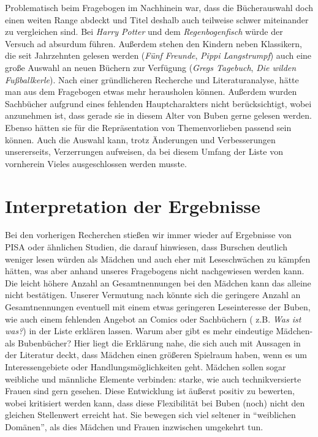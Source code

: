 

Problematisch beim Fragebogen im Nachhinein war, dass die Bücherauswahl
doch einen weiten Range abdeckt und Titel deshalb auch teilweise schwer
miteinander zu vergleichen sind. Bei \emph{Harry Potter} und dem
\emph{Regenbogenfisch} würde der Versuch ad absurdum führen. Außerdem
stehen den Kindern neben Klassikern, die seit Jahrzehnten gelesen werden
(\emph{Fünf Freunde}, \emph{Pippi Langstrumpf}) auch eine große Auswahl
an neuen Büchern zur Verfügung (\emph{Gregs Tagebuch}, \emph{Die wilden
Fußballkerle}). Nach einer gründlicheren Recherche und Literaturanalyse,
hätte man aus dem Fragebogen etwas mehr herausholen können. Außerdem
wurden Sachbücher aufgrund eines fehlenden Hauptcharakters nicht
berücksichtigt, wobei anzunehmen ist, dass gerade sie in diesem Alter
von Buben gerne gelesen werden. Ebenso hätten sie für die Repräsentation
von Themenvorlieben passend sein können. Auch die Auswahl kann, trotz
Änderungen und Verbesserungen unsererseits, Verzerrungen aufweisen, da
bei diesem Umfang der Liste von vornherein Vieles ausgeschlossen werden
musste.

\section{Interpretation der Ergebnisse}

Bei den vorherigen Recherchen stießen wir immer wieder auf Ergebnisse
von PISA oder ähnlichen Studien, die darauf hinwiesen, dass Burschen
deutlich weniger lesen würden als Mädchen und auch eher mit
Leseschwächen zu kämpfen hätten, was aber anhand unseres Fragebogens
nicht nachgewiesen werden kann. Die leicht höhere Anzahl an
Gesamtnennungen bei den Mädchen kann das alleine nicht bestätigen.
Unserer Vermutung nach könnte sich die geringere Anzahl an
Gesamtnennungen eventuell mit einem etwas geringeren Leseinteresse der
Buben, wie auch einem fehlenden Angebot an Comics oder Sachbüchern (
z.B. \emph{Was ist was?}) in der Liste erklären lassen. Warum aber gibt
es mehr eindeutige Mädchen- als Bubenbücher? Hier liegt die Erklärung
nahe, die sich auch mit Aussagen in der Literatur deckt, dass Mädchen
einen größeren Spielraum haben, wenn es um Interessengebiete oder
Handlungsmöglichkeiten geht. Mädchen sollen sogar weibliche und
männliche Elemente verbinden: starke, wie auch technikversierte Frauen
sind gern gesehen. Diese Entwicklung ist äußerst positiv zu bewerten,
wobei kritisiert werden kann, dass diese Flexibilität bei Buben (noch)
nicht den gleichen Stellenwert erreicht hat. Sie bewegen sich viel
seltener in ``weiblichen Domänen'', als dies Mädchen und Frauen
inzwischen umgekehrt tun.

